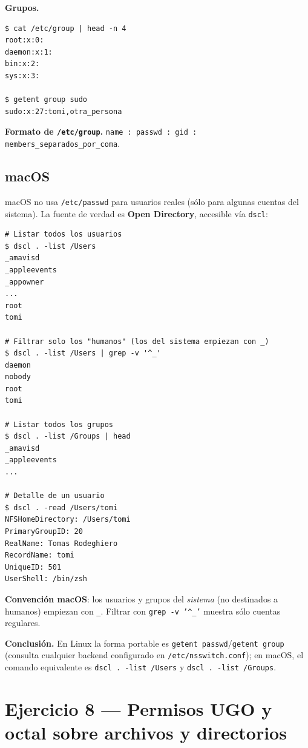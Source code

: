 \documentclass[11pt,a4paper]{article}
\begin{document}
\textbf{Grupos.}

\begin{lstlisting}[style=shellstyle]
$ cat /etc/group | head -n 4
root:x:0:
daemon:x:1:
bin:x:2:
sys:x:3:

$ getent group sudo
sudo:x:27:tomi,otra_persona
\end{lstlisting}

\textbf{Formato de \texttt{/etc/group}.} \texttt{name : passwd : gid :
members\_separados\_por\_coma}.

\subsection*{macOS}

macOS no usa \texttt{/etc/passwd} para usuarios reales (sólo para
algunas cuentas del sistema). La fuente de verdad es \textbf{Open
Directory}, accesible vía \texttt{dscl}:

\begin{lstlisting}[style=shellstyle]
# Listar todos los usuarios
$ dscl . -list /Users
_amavisd
_appleevents
_appowner
...
root
tomi

# Filtrar solo los "humanos" (los del sistema empiezan con _)
$ dscl . -list /Users | grep -v '^_'
daemon
nobody
root
tomi

# Listar todos los grupos
$ dscl . -list /Groups | head
_amavisd
_appleevents
...

# Detalle de un usuario
$ dscl . -read /Users/tomi
NFSHomeDirectory: /Users/tomi
PrimaryGroupID: 20
RealName: Tomas Rodeghiero
RecordName: tomi
UniqueID: 501
UserShell: /bin/zsh
\end{lstlisting}

\begin{idea}
\textbf{Convención macOS}: los usuarios y grupos del \emph{sistema}
(no destinados a humanos) empiezan con \texttt{\_}. Filtrar con
\texttt{grep -v '\textasciicircum\_'} muestra sólo cuentas regulares.
\end{idea}

\textbf{Conclusión.} En Linux la forma portable es
\texttt{getent passwd}/\texttt{getent group} (consulta cualquier
backend configurado en \texttt{/etc/nsswitch.conf}); en macOS, el
comando equivalente es \texttt{dscl . -list /Users} y
\texttt{dscl . -list /Groups}.

\section{Ejercicio 8 --- Permisos UGO y octal sobre archivos y directorios}
\end{document}
